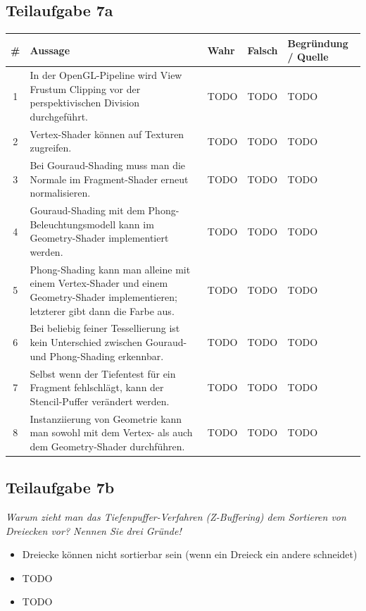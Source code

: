 \documentclass[a4paper]{scrartcl}
\begin{document}
\subsection*{Teilaufgabe 7a}
\begin{tabular}{cp{8cm}llp{4cm}}\toprule
\# & Aussage & Wahr & Falsch & Begründung / Quelle \\\midrule
 1 & In der OpenGL-Pipeline wird View Frustum Clipping vor der perspektivischen Division durchgeführt.                                    & TODO & TODO & TODO \\
 2 & Vertex-Shader können auf Texturen zugreifen.                                                                                         & TODO & TODO & TODO \\
 3 & Bei Gouraud-Shading muss man die Normale im Fragment-Shader erneut normalisieren.                                                    & TODO & TODO & TODO \\
 4 & Gouraud-Shading mit dem Phong-Beleuchtungsmodell kann im Geometry-Shader implementiert werden.                                       & TODO & TODO & TODO \\
 5 & Phong-Shading kann man alleine mit einem Vertex-Shader und einem Geometry-Shader implementieren; letzterer gibt dann die Farbe aus.  & TODO & TODO & TODO \\
 6 & Bei beliebig feiner Tessellierung ist kein Unterschied zwischen Gouraud- und Phong-Shading erkennbar.                                & TODO & TODO & TODO \\
 7 & Selbst wenn der Tiefentest für ein Fragment fehlschlägt, kann der Stencil-Puffer verändert werden.                                   & TODO & TODO & TODO \\
 8 & Instanziierung von Geometrie kann man sowohl mit dem Vertex- als auch dem Geometry-Shader durchführen.                               & TODO & TODO & TODO \\\bottomrule
\end{tabular}

\subsection*{Teilaufgabe 7b}
\textit{Warum zieht man das Tiefenpuffer-Verfahren (Z-Buffering) dem Sortieren von Dreiecken vor? Nennen Sie drei Gründe!}

\begin{itemize}
    \item Dreiecke können nicht sortierbar sein (wenn ein Dreieck ein andere schneidet)
    \item TODO
    \item TODO
\end{itemize}
\end{document}
